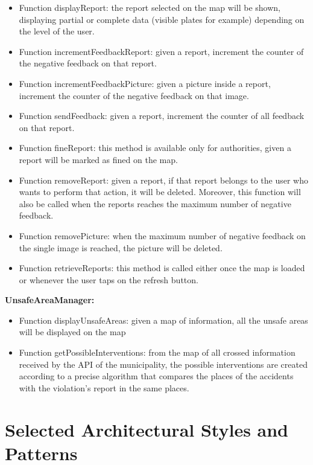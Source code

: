 \documentclass[../RASD.tex]{subfiles}
\begin{document}
    \begin{itemize}
        \item     Function displayReport: the report selected on the map will be shown, displaying partial or complete data (visible plates for example)
        depending on the level of the user.
        \item     Function incrementFeedbackReport: given a report, increment the counter of the negative feedback on that report.
        \item     Function incrementFeedbackPicture: given a picture inside a report, increment the counter of the negative feedback on that image.
        \item     Function sendFeedback: given a report, increment the counter of all feedback on that report.
        \item     Function fineReport: this method is available only for authorities, given a report will be marked as fined on the map.
        \item     Function removeReport: given a report, if that report belongs to the user who wants to perform that action, it will be deleted.
        Moreover, this function will also be called when the reports reaches the maximum number of negative feedback.
        \item     Function removePicture: when the maximum number of negative feedback on the single image is reached, the picture will be deleted.
        \item     Function retrieveReports: this method is called either once the map is loaded or whenever the user taps on the refresh button.
    \end{itemize}
    \textbf{UnsafeAreaManager:}
    \begin{itemize}
        \item     Function displayUnsafeAreas: given a map of information, all the unsafe areas will be displayed on the map
        \item     Function getPossibleInterventions: from the map of all crossed information received by the API of the municipality,
        the possible interventions are created according to a precise algorithm that compares the places of the accidents with the violation’s report
        in the same places.
    \end{itemize}
    \newpage
    \section{Selected Architectural Styles and Patterns}\label{sec:selected-architectural-styles-and-patterns}
\end{document}
